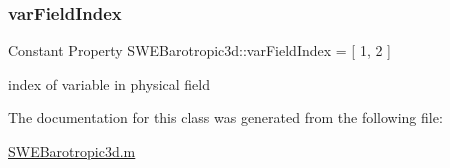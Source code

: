 \mbox{\label{class_s_w_e_barotropic3d_a9e793f738add903d602ff5a9508cdb82}} 
\subsubsection{\texorpdfstring{var\+Field\+Index}{varFieldIndex}}
{\footnotesize\ttfamily Constant Property S\+W\+E\+Barotropic3d\+::var\+Field\+Index = \mbox{[} 1, 2 \mbox{]}}



index of variable in physical field 



The documentation for this class was generated from the following file\+:\begin{DoxyCompactItemize}
\item 
\hyperlink{_s_w_e_barotropic3d_8m}{S\+W\+E\+Barotropic3d.\+m}\end{DoxyCompactItemize}
